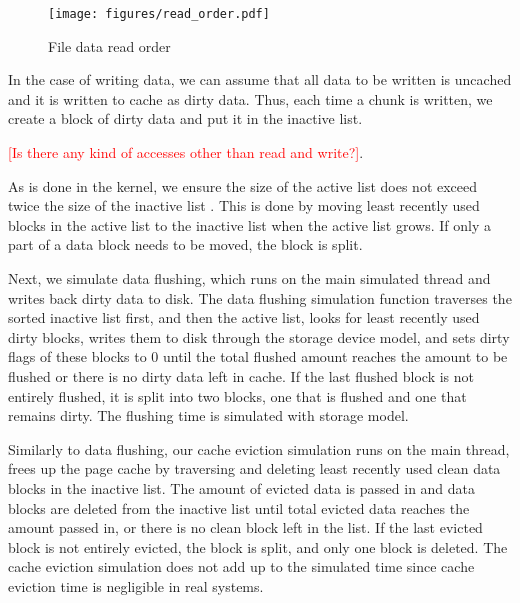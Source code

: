 \documentclass[conference]{IEEEtran}
\begin{document}
			\begin{figure}
   				\centering
   				\texttt{[image: figures/read\_order.pdf]}
   				\caption{File data read order}	\label{fig:read_order}
			\end{figure}	
			
			In the case of writing data, we can assume that all data to be written is 
			uncached and it is written to cache as dirty data. 
			Thus, each time a chunk is written, we create a block of dirty data and 
			put it in the inactive list.
			
			\textcolor{red}{[Is there any kind of accesses other than read and write?]}. 			
			
            As is done in the kernel, we ensure the size of the active list does not 
            exceed twice the size of the inactive list 
			\cite{gorman2004understanding, linuxdev3rd2010}. 
			This is done by moving least recently used blocks in the active list 
			to the inactive list when the active list grows. If only a part of a data 
			block needs to be moved, the block is split.

			Next, we simulate data flushing, which runs on the main simulated 
			thread and writes back dirty data to disk. 
			The data flushing simulation function traverses the sorted 
			inactive list first, and then the active list, looks for least recently used 
			dirty blocks, writes them to disk through the storage device model, 
			and sets dirty flags of these blocks to 0 until the total flushed amount 
			reaches the amount to be flushed or there is no dirty data left in cache. 
			If the last flushed block is not entirely flushed, it is split into 
			two blocks, one that is flushed and one that remains dirty.
			The flushing time is simulated with storage model.
				
			Similarly to data flushing, our cache eviction simulation runs on 
			the main thread, frees up the page cache by traversing and deleting 
			least recently used clean data blocks in the inactive list.
			The amount of evicted data is passed in and data blocks are deleted 
			from the inactive list until total evicted data reaches the amount 
			passed in, or there is no clean block left in the list.
			If the last evicted block is not entirely evicted, the block is split, 
			and only one block is deleted.
			The cache eviction simulation does not add up to the simulated time 
			since cache eviction time is negligible in real systems.		
			
\end{document}
